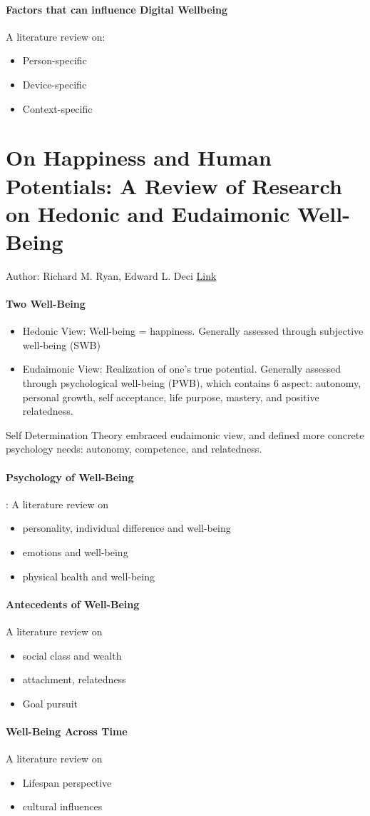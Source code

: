 \paragraph{Factors that can influence Digital Wellbeing} A literature review on: 
    \begin{itemize}
        \item Person-specific
        \item Device-specific
        \item Context-specific
    \end{itemize}
    
\section{On Happiness and Human Potentials: A Review of Research on Hedonic and Eudaimonic Well-Being}
Author: Richard M. Ryan, Edward L. Deci
\href{https://pubmed.ncbi.nlm.nih.gov/11148302/}{Link}

\paragraph{Two Well-Being}
    \begin{itemize}
        \item Hedonic View: Well-being = happiness. Generally assessed through subjective well-being (SWB) 
        \item Eudaimonic View: Realization of one's true potential. Generally assessed through psychological well-being (PWB), which contains 6 aspect: autonomy, personal growth, self acceptance, life purpose, mastery, and positive relatedness. 
    \end{itemize}
Self Determination Theory embraced eudaimonic view, and defined more concrete psychology needs: autonomy, competence, and relatedness. 

\paragraph{Psychology of Well-Being}: A literature review on 
    \begin{itemize}
        \item personality, individual difference and well-being 
        \item emotions and well-being
        \item physical health and well-being
    \end{itemize}

\paragraph{Antecedents of Well-Being} A literature review on 
    \begin{itemize}
        \item social class and wealth
        \item attachment, relatedness 
        \item Goal pursuit
    \end{itemize}

\paragraph{Well-Being Across Time} A literature review on 
    \begin{itemize}
        \item Lifespan perspective
        \item cultural influences
    \end{itemize}